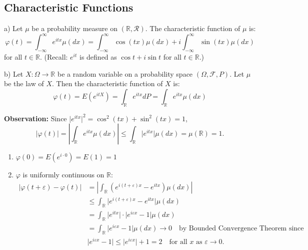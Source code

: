 \subsection{Characteristic Functions}
\begin{definition}
a) Let \(\mu\) be a probability measure on \((\mathbb{R}, \mathcal{R})\). The characteristic function of \(\mu\) is:
\[\varphi(t) = \int_{-\infty}^{\infty} e^{itx} \mu(dx) = \int_{-\infty}^{\infty} \cos(tx)\mu(dx) + i \int_{-\infty}^{\infty} \sin(tx)\mu(dx)\]
for all \( t \in \mathbb{R} \).
\newline
(Recall: \( e^{it} \) is defined as \( \cos t + i \sin t \) for all \( t \in \mathbb{R} \).)

b) Let \( X: \Omega \rightarrow \mathbb{R} \) be a random variable on a probability space \((\Omega, \mathcal{F}, P)\). Let \(\mu\) be the law of \(X\). Then the characteristic function of \(X\) is:
\[\varphi(t) = E(e^{itX}) = \int_{\mathbb{R}} e^{itx} dP = \int_{\mathbb{R}} e^{itx} \mu(dx)\]
\end{definition}



\textbf{Observation:} Since \( \lvert e^{itx} \rvert^2 = \cos^2(tx) + \sin^2(tx) = 1 \), 
\[
\lvert \varphi(t) \rvert = \left\lvert \int_{\mathbb{R}} e^{itx} \mu(dx) \right\rvert \leq \int_{\mathbb{R}} \lvert e^{itx} \rvert \mu(dx) = \mu(\mathbb{R}) = 1.
\]

\begin{enumerate}
  \item \(\varphi(0) = E(e^{i \cdot 0}) = E(1) = 1\)
  
  \item \(\varphi\) is uniformly continuous on \(\mathbb{R}\):
  \begin{align*}
  \lvert \varphi(t+\varepsilon) - \varphi(t) \rvert &= \left\lvert \int_{\mathbb{R}} (e^{i(t+\varepsilon)x} - e^{itx}) \mu(dx) \right\rvert \\
  &\leq \int_{\mathbb{R}} \lvert e^{i(t+\varepsilon)x} - e^{itx} \rvert \mu(dx) \\
  &= \int_{\mathbb{R}} \lvert e^{itx} \rvert \cdot \lvert e^{i\varepsilon x} - 1 \rvert \mu(dx) \\
  &= \int_{\mathbb{R}} \lvert e^{i\varepsilon x} - 1 \rvert \mu(dx) \to 0 \quad \text{by Bounded Convergence Theorem since} \\
  &\lvert e^{i\varepsilon x} - 1 \rvert \leq \lvert e^{i\varepsilon x} \rvert + 1 = 2 \quad \text{for all } x \text{ as } \varepsilon \to 0.
  \end{align*}
\end{enumerate}
